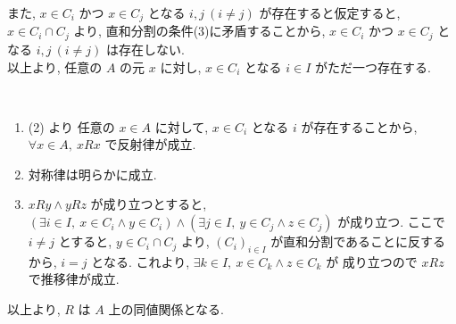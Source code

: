 \begin{nmprob}
{また, $x \in C_i$ かつ $x \in C_j$ となる $i, j\ (i \neq j)$ が存在すると仮定すると, $x \in C_i \cap C_j$ より, 直和分割の条件(3)に矛盾することから, 
$x \in C_i$ かつ $x \in C_j$ となる $i, j\ (i \neq j)$ は存在しない.\\
以上より, 任意の $A$ の元 $x$ に対し, $x \in C_i$ となる $i \in I$ がただ一つ存在する.
\item \
\begin{enumerate}
    \item (2) より 任意の $x \in A$ に対して, $x \in C_i$ となる $i$ が存在することから, $\forall x \in A,\ xRx$ で反射律が成立.
    \item 対称律は明らかに成立.
    \item $xRy \land yRz$ が成り立つとすると, $(\exists i \in I,\ x \in C_i \land y \in C_i) \land (\exists j \in I,\ y \in C_j \land z \in C_j)$ が成り立つ.
    ここで $i \neq j$ とすると, $y \in C_i \cap C_j$ より, $(C_i)_{i\in I}$ が直和分割であることに反するから, $i = j$ となる. これより, $\exists k \in I,\ x \in C_k \land z \in C_k$ が
    成り立つので $xRz$ で推移律が成立.
\end{enumerate}
以上より, $R$ は $A$ 上の同値関係となる.
}
\makeatletter\tagsleft@false\makeatother
\end{nmprob}



